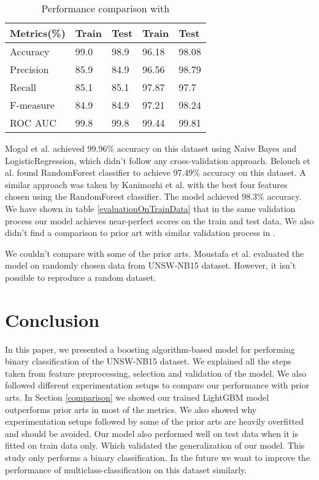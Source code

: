 \documentclass[14pt, conference]{IEEEtran}
\begin{document}
\begin{table}[H]
\normalsize
\centering
\caption{Performance comparison with \cite{meghdouri2018analysis}}
\label{performanceComparisonWithMeghdouri}
\renewcommand{\arraystretch}{1.2}
\begin{tabular}{|C{1.9cm}|C{1.6cm}|C{1.4cm}|C{0.9cm}|C{0.9cm}|}
\hline
\textbf{Metrics(\%)} & \textbf{Train\cite{meghdouri2018analysis}} & \textbf{Test\cite{meghdouri2018analysis}} & \textbf{Train} & \textbf{Test} \\ \hline
Accuracy & 99.0 & 98.9 & 96.18 & 98.08\\ \hline
Precision  & 85.9 & 84.9 & 96.56 & 98.79\\ \hline
Recall  & 85.1 & 85.1 & 97.87 & 97.7\\ \hline
F-measure  & 84.9 & 84.9 & 97.21 & 98.24 \\ \hline
ROC AUC  & 99.8 & 99.8& 99.44 & 99.81\\ \hline
\end{tabular}
\end{table}


Mogal et al. \cite{mogal2017nids} achieved 99.96\% accuracy on this dataset using Naive Bayes and LogisticRegression, which didn't follow any cross-validation approach. Belouch et al. \cite{belouch2018performance} found RandomForest classifier to achieve 97.49\% accuracy on this dataset. A similar approach was taken by Kanimozhi et al. \cite{Kanimozhi2019UNSW-NB15} with the best four features chosen using the RandomForest classifier. The model achieved 98.3\% accuracy. We have shown in table \ref{evaluationOnTrainData} that in the same validation process our model achieves near-perfect scores on the train and test data. We also didn't find a comparison to prior art with similar validation process \cite{mogal2017nids} in \cite{belouch2018performance} \cite{Kanimozhi2019UNSW-NB15}.

We couldn't compare with some of the prior arts. Moustafa et al. \cite{moustafa2018anomaly} \cite{moustafa2019holistic} evaluated the model on randomly chosen data from UNSW-NB15 dataset. However, it isn't possible to reproduce a random dataset.


\section{Conclusion \label{conclusion}}
In this paper, we presented a boosting algorithm-based model for performing binary classification of the UNSW-NB15 dataset. We explained all the steps taken from feature preprocessing, selection and validation of the model. We also followed different experimentation setups to compare our performance with prior arts. In Section \ref{comparison} we showed our trained LightGBM model outperforms prior arts in most of the metrics. We also showed why experimentation setups followed by some of the prior arts are heavily overfitted and should be avoided. Our model also performed well on test data when it is fitted on train data only. Which validated the generalization of our model. This study only performs a binary classification. In the future we want to improve the performance of multiclass-classification on this dataset similarly. 


 
\end{document}
